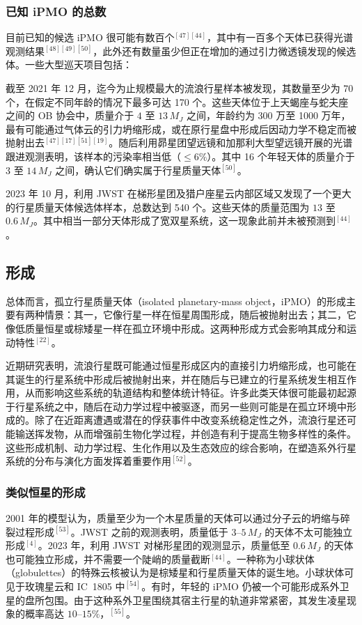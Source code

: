 \subsubsection{已知 iPMO 的总数}
目前已知的候选 iPMO 很可能有数百个$^{[47][44]}$，其中有一百多个天体已获得光谱观测结果$^{[48][49][50]}$，此外还有数量虽少但正在增加的通过引力微透镜发现的候选体。一些大型巡天项目包括：

截至 2021 年 12 月，迄今为止规模最大的流浪行星样本被发现，其数量至少为 70 个，在假定不同年龄的情况下最多可达 170 个。这些天体位于上天蝎座与蛇夫座之间的 OB 协会中，质量介于 $4$ 至 $13\,M_J$ 之间，年龄约为 300 万至 1000 万年，最有可能通过气体云的引力坍缩形成，或在原行星盘中形成后因动力学不稳定而被抛射出去$^{[47][17][51][19]}$。随后利用昴星团望远镜和加那利大型望远镜开展的光谱跟进观测表明，该样本的污染率相当低（$\leq6\%$）。其中 16 个年轻天体的质量介于 $3$ 至 $14\,M_J$ 之间，确认它们确实属于行星质量天体$^{[50]}$。

2023 年 10 月，利用 JWST 在梯形星团及猎户座星云内部区域又发现了一个更大的行星质量天体候选体样本，总数达到 540 个。这些天体的质量范围为 $13$ 至 $0.6\,M_J$。其中相当一部分天体形成了宽双星系统，这一现象此前并未被预测到$^{[44]}$。
\subsection{形成}
总体而言，孤立行星质量天体（isolated planetary-mass object，iPMO）的形成主要有两种情景：其一，它像行星一样在恒星周围形成，随后被抛射出去；其二，它像低质量恒星或棕矮星一样在孤立环境中形成。这两种形成方式会影响其成分和运动特性$^{[22]}$。

近期研究表明，流浪行星既可能通过恒星形成区内的直接引力坍缩形成，也可能在其诞生的行星系统中形成后被抛射出来，并在随后与已建立的行星系统发生相互作用，从而影响这些系统的轨道结构和整体统计特征。许多此类天体很可能最初起源于行星系统之中，随后在动力学过程中被驱逐，而另一些则可能是在孤立环境中形成的。除了在近距离遭遇或潜在的俘获事件中改变系统稳定性之外，流浪行星还可能输送挥发物，从而增强前生物化学过程，并创造有利于提高生物多样性的条件。这些形成机制、动力学过程、生化作用以及生态效应的综合影响，在塑造系外行星系统的分布与演化方面发挥着重要作用$^{[52]}$。
\subsubsection{类似恒星的形成}
2001 年的模型认为，质量至少为一个木星质量的天体可以通过分子云的坍缩与碎裂过程形成$^{[53]}$。JWST 之前的观测表明，质量低于 $3$--$5\,M_J$ 的天体不太可能独立形成$^{[4]}$。2023 年，利用 JWST 对梯形星团的观测显示，质量低至 $0.6\,M_J$ 的天体也可能独立形成，并不需要一个陡峭的质量截断$^{[44]}$。一种称为小球状体（globulettes）的特殊云核被认为是棕矮星和行星质量天体的诞生地。小球状体可见于玫瑰星云和 IC~1805 中$^{[54]}$。有时，年轻的 iPMO 仍被一个可能形成系外卫星的盘所包围。由于这种系外卫星围绕其宿主行星的轨道非常紧密，其发生凌星现象的概率高达 $10$--$15\%$，$^{[55]}$。

